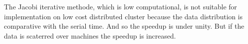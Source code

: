 \documentclass[times,10pt,twocolumn]{article}
\begin{document}
The Jacobi iterative methode, which is low computational, is not
suitable for implementation on low cost distributed cluster
because the data distribution is comparative with the serial time.
And so the speedup is under unity. But if the data is scaterred over
machines the speedup is increased.

\nocite{numerice}


\end{document}
